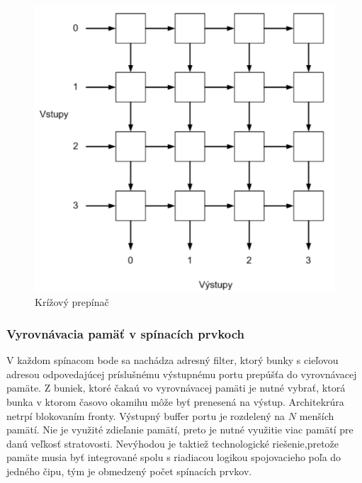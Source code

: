 \begin{figure}[ht]
\centering
  \begin{center}
    \includegraphics[scale=0.8]{images/kriz_prep.png}
  \end{center}
  \caption[Krížový prepínač]{Krížový prepínač}
\end{figure}

\subsubsection{Vyrovnávacia pamäť v spínacích prvkoch}
V každom spínacom bode sa nachádza adresný filter, ktorý bunky s cieľovou adresou odpovedajúcej príslušnému výstupnému portu prepúšťa do vyrovnávacej pamäte. Z buniek, ktoré čakaú vo vyrovnávacej pamäti je nutné vybrať, ktorá bunka v ktorom časovo okamihu môže byť prenesená na výstup. Architekrúra netrpí blokovaním fronty. Výstupný buffer portu je rozdelený na $N$ menších pamätí. Nie je využité zdieľanie pamätí, preto je nutné využitie viac pamätí pre danú veľkosť stratovosti. Nevýhodou je taktiež technologické riešenie,pretože pamäte musia byť integrované spolu s riadiacou logikou spojovacieho poľa do jedného čipu, tým je obmedzený počet spínacích prvkov.


